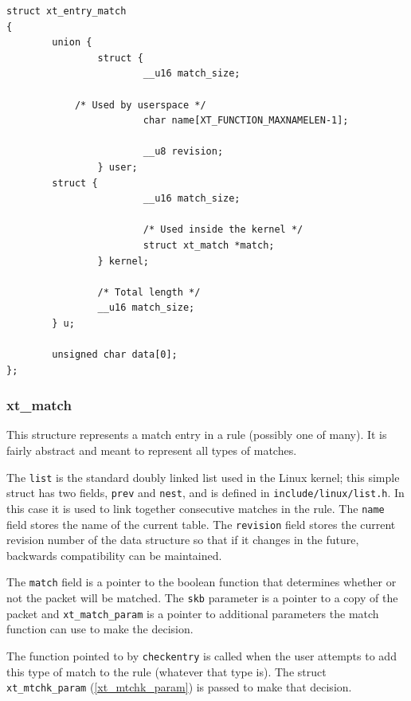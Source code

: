 \documentclass[a4paper,10pt]{article}
\newcommand{\code}[1]{\texttt{{#1}}}
\begin{document}
\begin{lstlisting}
struct xt_entry_match
{
        union {
                struct {
                        __u16 match_size;

			/* Used by userspace */
                        char name[XT_FUNCTION_MAXNAMELEN-1];

                        __u8 revision;
                } user;
		struct {
                        __u16 match_size;

                        /* Used inside the kernel */
                        struct xt_match *match;
                } kernel;

                /* Total length */
                __u16 match_size;
        } u;

        unsigned char data[0];
};
\end{lstlisting}

\subsubsection{xt\_match}\label{xt_match}
This structure represents a match entry in a rule (possibly one of
many). It is fairly abstract and meant to represent all types of
matches.

The \code{list} is the standard doubly linked list used in
the Linux kernel; this simple struct has two fields, \code{prev} and
\code{nest}, and  is defined in \code{include/linux/list.h}. In this
case it is used to link together consecutive matches in the rule. The \code{name} field stores the name of the current
table. The \code{revision} field stores the
current revision number of the data structure so that if it changes in
the future, backwards compatibility can be maintained.

The \code{match} field is a pointer to the boolean function that
determines whether or not the packet will be matched. The \code{skb}
parameter is a pointer to a copy of the packet and
\code{xt\_match\_param} is a pointer to additional parameters the
match function can use to make the decision.

The function pointed to by \code{checkentry} is called when the user
attempts to add this type of match to the rule (whatever that type is). The struct
\code{xt\_mtchk\_param} (\ref{xt_mtchk_param}) is passed to make that decision. 
\end{document}
